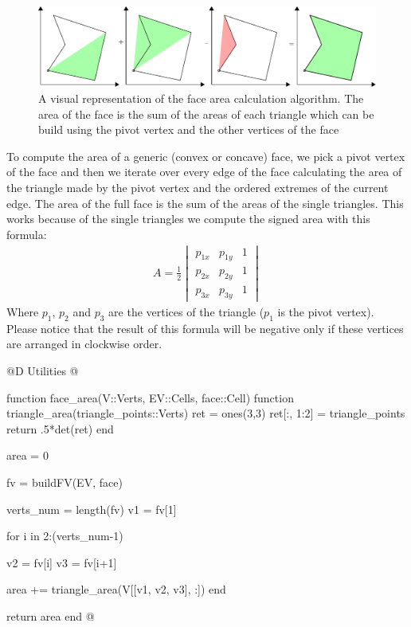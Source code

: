 \begin{figure}[h]
    \includegraphics[width=\textwidth]{./img/ch5-area.pdf}
    \caption{A visual representation of the face area calculation algorithm. The area
    of the face is the sum of the areas of each triangle which can be build using the 
    pivot vertex and the other vertices of the face}
\end{figure}
\noindent
To compute the area of a generic (convex or concave) face,
we pick a pivot vertex of the face and then we iterate over
every edge of the face calculating the area of the triangle
made by the pivot vertex and the ordered extremes of the current edge.
The area of the full face is the sum of the areas of the single triangles.
This works because of the single triangles we compute the signed area with
this formula:
\begin{gather*}
    A = \frac{1}{2}
    \begin{vmatrix}
        p_{1x} & p_{1y} & 1 \\
        p_{2x} & p_{2y} & 1 \\
        p_{3x} & p_{3y} & 1
    \end{vmatrix}
\end{gather*}
Where $p_1$, $p_2$ and $p_3$ are the vertices of the triangle ($p_1$ is the pivot vertex). 
Please notice that the result of this formula will be negative only if these vertices 
are arranged in clockwise order.

@D Utilities
@{function face_area(V::Verts, EV::Cells, face::Cell)
    function triangle_area(triangle_points::Verts)
        ret = ones(3,3)
        ret[:, 1:2] = triangle_points
        return .5*det(ret)
    end

    area = 0

    fv = buildFV(EV, face)

    verts_num = length(fv)
    v1 = fv[1]

    for i in 2:(verts_num-1)

        v2 = fv[i]
        v3 = fv[i+1]

        area += triangle_area(V[[v1, v2, v3], :])
    end

    return area
end
@}

